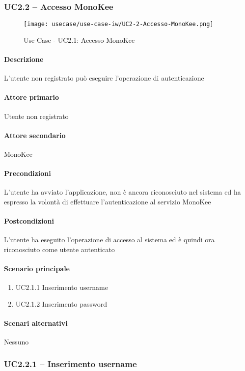 \subsubsection{UC2.2 – Accesso MonoKee}
\begin{figure}[!htbp] 
    \centering 
    \texttt{[image: usecase/use-case-iw/UC2-2-Accesso-MonoKee.png]} 
    \caption{Use Case - UC2.1: Accesso MonoKee}
\end{figure}

\paragraph{Descrizione}  L’utente non registrato può eseguire l’operazione di autenticazione 
\paragraph{Attore primario}  Utente non registrato
\paragraph{Attore secondario}  MonoKee
\paragraph{Precondizioni}  L’utente ha avviato l’applicazione, non è ancora riconosciuto nel sistema ed ha espresso la volontà di effettuare l’autenticazione al servizio MonoKee
\paragraph{Postcondizioni}  L’utente ha eseguito l’operazione di accesso al sistema ed è quindi ora riconosciuto come utente autenticato
\paragraph{Scenario principale}  
    \begin{enumerate}
        \item UC2.1.1 Inserimento username
        \item UC2.1.2 Inserimento password
    \end{enumerate}
\paragraph{Scenari alternativi}  Nessuno


\subsubsection{UC2.2.1 – Inserimento username}
